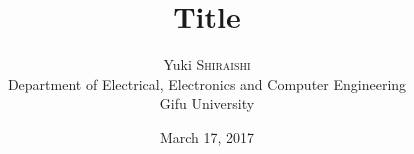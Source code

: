 \begin{titlepage}
  \title{
    Title
  }
  \author{
    { Yuki \textsc{Shiraishi}}\\
    {\small Department of Electrical, Electronics and Computer Engineering} \\
    {\small Gifu University}
  }
  \date{March 17, 2017}
\end{titlepage}
